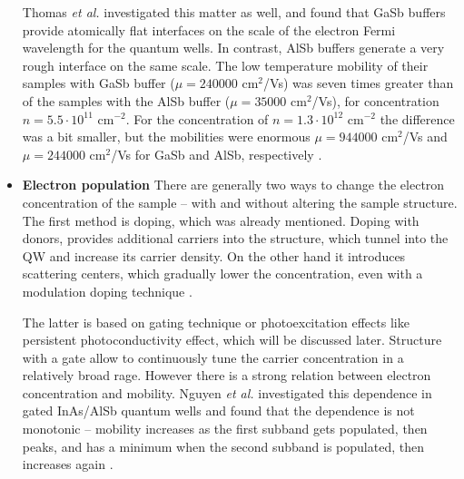 \documentclass[titlepage,a4paper]{book}
\newcommand{\wciecie}{\quad\phantom{v}}
\begin{document}
\begin{itemize}
Thomas \textit{et al.} \cite{Thomas_Buffer} investigated this matter as well, and found that GaSb buffers provide atomically flat interfaces on the scale of the electron Fermi wavelength for the quantum wells. In contrast, AlSb buffers generate a very rough interface on the same scale. The low temperature mobility of their samples with GaSb buffer ($\mu = 240000$ cm$^2$/Vs) was seven times greater than of the samples with the AlSb buffer ($\mu = 35000$ cm$^2$/Vs), for concentration $n = 5.5 \cdot 10^{11}$ cm$^{-2}$. For the concentration of $n = 1.3 \cdot 10^{12}$ cm$^{-2}$ the difference was a bit smaller, but the mobilities were enormous $\mu = 944000$ cm$^2$/Vs and $\mu = 244000$ cm$^2$/Vs for GaSb and AlSb, respectively \cite{Nguyen_Mobility}\cite{Thomas_Buffer}\cite{Nguyen_Buffer}.

\item \textbf{Electron population} \newline
\wciecie
There are generally two ways to change the electron concentration of the sample -- with and without altering the sample structure. The first method is doping, which was already mentioned. Doping with donors, provides additional carriers into the structure, which tunnel into the QW and increase its carrier density. On the other hand it introduces scattering centers, which gradually lower the concentration, even with a modulation doping technique \cite{Nguyen_Buffer}. 

The latter is based on gating technique or photoexcitation effects like persistent photoconductivity effect, which will be discussed later. Structure with a gate allow to continuously tune the carrier concentration in a relatively broad rage. However there is a strong relation between electron concentration and mobility. Nguyen \textit{et al.} investigated this dependence in gated InAs/AlSb quantum wells and found that the dependence is not monotonic -- mobility increases as the first subband gets populated, then peaks, and has a minimum when the second subband is populated, then increases again \cite{Nguyen_Mobility}.
\end{itemize}
\end{document}

